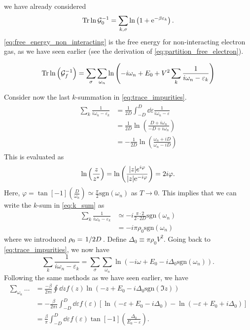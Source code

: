 we have already considered
\begin{equation}
\label{eq:free_energy_non_interacting}
	\Tr\ln\mathcal{G}_0^{-1} = \sum_{k,\sigma}\ln\left(1 + \mathrm{e}^{-\beta\varepsilon_k}\right).
\end{equation}
\eqref{eq:free_energy_non_interacting} is the free energy for non-interacting electron gas, as we have seen earlier (see the derivation of \eqref{eq:partition_free_electron}).

\begin{equation}
\label{eq:trace_impurities}
	\Tr\ln\left(\mathcal{G}_f^{-1}\right) = \sum_\sigma\sum_{\omega_n}\ln\left(-i\omega_n + E_0 +V^2\sum_k \frac{1}{i\omega_n - \varepsilon_k}\right)
\end{equation}

Consider now the last $k$-summation in \eqref{eq:trace_impurities}.
\begin{align}
\label{eq:k_sum}
\begin{split}
	\sum_k\frac{1}{i\omega_n - \varepsilon_k} &= \frac{1}{2D}\int_{-D}^D\dd{\varepsilon}\frac{1}{i\omega_n - \varepsilon} \\
	&= \frac{1}{2D}\ln\left(\frac{D+i\omega_n}{-D + i\omega_n}\right)\\
	&=-\frac{1}{2D}\ln\left(\frac{\omega_n+iD}{\omega_n-iD}\right)
\end{split}
\end{align}
This is evaluated as
\begin{equation}
	\ln\left(\frac{z}{z^*}\right) = \ln\left(\frac{|z|e^{i\varphi}}{|z|\mathrm{e}^{-i\varphi}}\right) = 2i\varphi.
\end{equation}
Here, $\varphi = \tan[-1](\frac{D}{\omega_n}) \simeq \frac{\pi}{2}\mathrm{sgn}(\omega_n)$ as $T\rightarrow 0$.
This implies that we can write the $k$-sum in \eqref{eq:k_sum} as
\begin{align}
	\sum_k\frac{1}{i\omega_n - \varepsilon_k} &\simeq -i\frac{\pi\cdot 2}{2\cdot 2D}\mathrm{sgn}(\omega_n)\\
	&= -i\pi\rho_0\mathrm{sgn}(\omega_n)
\end{align}
where we introduced $\rho_0 = \flatfrac{1}{2D}$. Define $\Delta_0 \equiv \pi\rho_0 V^2$. Going back to \eqref{eq:trace_impurities}, we now have
\begin{equation}
	\sum_k\frac{1}{i\omega_n - \varepsilon_k} = \sum_\sigma\sum_{\omega_n}\ln\left(-i\omega + E_0 - i\Delta_0 \mathrm{sgn}(\omega_n)\right).
\end{equation}
Following the same methods as we have seen earlier, we have
\begin{align}
	\sum_{\omega_n}\dots &= \frac{-\beta}{2\pi i}\oint\dd{z}f(z)\ln(-z+E_0-i\Delta_0\mathrm{sgn}(\Im{z}))\nonumber\\
	&= -\frac{\beta}{2\pi i }\int_{-D}^{D}\dd{\varepsilon}f(\varepsilon)\left[\ln(-\varepsilon + E_0- i\Delta_0) - \ln(-\varepsilon + E_0 + i\Delta_0)\right] \nonumber\\
	&= \frac{\beta}{\pi}\int_{-D}^D\dd{\varepsilon}f(\varepsilon)\tan[-1](\frac{\Delta_0}{E_0 - \varepsilon}).
\end{align}
